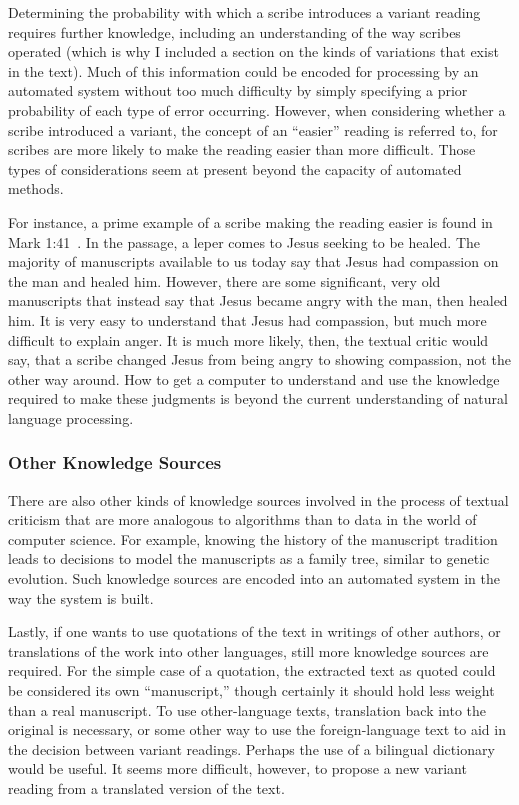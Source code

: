 \documentclass[onecolumn, 12pt]{article}
\begin{document}
Determining the probability with which a scribe introduces a variant reading
requires further knowledge, including an understanding of the way scribes
operated (which is why I included a section on the kinds of variations that
exist in the text).  Much of this information could be encoded for processing
by an automated system without too much difficulty by simply specifying a prior
probability of each type of error occurring.  However, when considering whether
a scribe introduced a variant, the concept of an ``easier'' reading is referred
to, for scribes are more likely to make the reading easier than more difficult.
Those types of considerations seem at present beyond the capacity of automated
methods.

For instance, a prime example of a scribe making the reading easier is found in
Mark 1:41~\cite[pp. 133--139]{ehrman-2005-misquoting-jesus}.  In the passage, a
leper comes to Jesus seeking to be healed.  The majority of manuscripts
available to us today say that Jesus had compassion on the man and healed him.
However, there are some significant, very old manuscripts that instead say that
Jesus became angry with the man, then healed him.  It is very easy to
understand that Jesus had compassion, but much more difficult to explain anger.
It is much more likely, then, the textual critic would say, that a scribe
changed Jesus from being angry to showing compassion, not the other way around.
How to get a computer to understand and use the knowledge required to make
these judgments is beyond the current understanding of natural language
processing.

\subsubsection{Other Knowledge Sources}

There are also other kinds of knowledge sources involved in the process of
textual criticism that are more analogous to algorithms than to data in the
world of computer science.  For example, knowing the history of the manuscript
tradition leads to decisions to model the manuscripts as a family tree, similar
to genetic evolution.  Such knowledge sources are encoded into an automated
system in the way the system is built.

Lastly, if one wants to use quotations of the text in writings of other
authors, or translations of the work into other languages, still more knowledge
sources are required.  For the simple case of a quotation, the extracted text
as quoted could be considered its own ``manuscript,'' though certainly it
should hold less weight than a real manuscript.  To use other-language texts,
translation back into the original is necessary, or some other way to use the
foreign-language text to aid in the decision between variant readings.  Perhaps
the use of a bilingual dictionary would be useful.  It seems more difficult,
however, to propose a new variant reading from a translated version of the
text.
\end{document}
